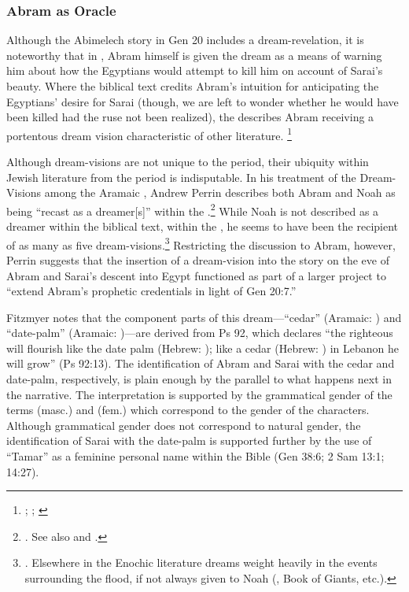 \subsubsection{Abram as Oracle}
Although the Abimelech story in Gen 20 includes a dream-revelation, it is noteworthy that in \ga, Abram himself is given the dream as a means of warning him about how the Egyptians would attempt to kill him on account of Sarai's beauty. Where the biblical text credits Abram's intuition for anticipating the Egyptians' desire for Sarai (though, we are left to wonder whether he would have been killed had the ruse not been realized), the \ga describes Abram receiving a portentous dream vision characteristic of other \secondtemple literature.%
%
\footnote{\cite{gevirtz_maarav1992}; \cite[184]{fitzmyer2004}; \cite{dacy_tzoref2013}}
%

Although dream-visions are not unique to the \secondtemple period, their ubiquity within Jewish literature from the \secondtemple period is indisputable. In his treatment of the Dream-Visions among the Aramaic \dss, Andrew Perrin describes both Abram and Noah as being ``recast as a dreamer[s]'' within the \ga.\footnote{\cite[52--57]{perrin2015}. See also \cite{eshel_klostergaard-etal2009} and \cite{machiela_falk-etal2010}.} While Noah is not described as a dreamer within the biblical text, within the \ga, he seems to have been the recipient of as many as five dream-visions.\footnote{\cite[53]{perrin2015}. Elsewhere in the Enochic literature dreams weight heavily in the events surrounding the flood, if not always given to Noah (\firstenoch, Book of Giants, etc.).} Restricting the discussion to Abram, however, Perrin suggests that the insertion of a dream-vision into the story on the eve of Abram and Sarai's descent into Egypt functioned as part of a larger project to ``extend Abram's prophetic credentials in light of Gen 20:7.''\autocite[55]{perrin2015} 

Fitzmyer notes that the component parts of this dream---``cedar'' (Aramaic: ) and ``date-palm'' (Aramaic: )---are derived from Ps 92, which declares ``the righteous will flourish like the date palm (Hebrew: ); like a cedar (Hebrew: ) in Lebanon he will grow'' (Ps 92:13). The identification of Abram and Sarai with the cedar and date-palm, respectively, is plain enough by the parallel to what happens next in the narrative. The interpretation is supported by the grammatical gender of the terms  (masc.) and  (fem.) which correspond to the gender of the characters. Although grammatical gender does not correspond to natural gender, the identification of Sarai with the date-palm is supported further by the use of ``Tamar'' as a feminine personal name within the Bible (Gen 38:6; 2 Sam 13:1; 14:27).

